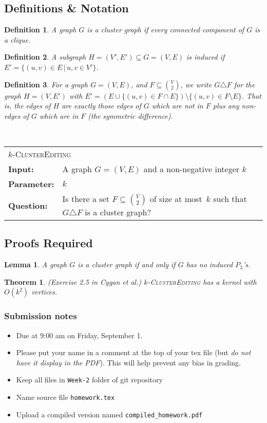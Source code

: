 \documentclass{article}
\newcommand{\defproblem}[4]{%
  \hfill\\\smallskip\noindent%
  \begin{tabularx}{\textwidth}{|l X|}%
    \hline%
    \multicolumn{2}{|l|}{\pname{#1}}\\%
    \textbf{Input:}&#2\\%
    \textbf{Parameter:}&#3\\%
    \textbf{Question:}&#4\smallskip\\\hline%
  \end{tabularx}%
  \smallskip%
}%
\newcommand{\pname}[1]{\textnormal{\textsc{#1}}}
\newtheorem*{theorem}{Theorem}
\newtheorem{definition}{Definition}
\newtheorem*{lemma}{Lemma}
\begin{document}
\subsection*{Definitions \& Notation}
\begin{definition}
A graph $G$ is a \emph{cluster graph} if every connected component of $G$ is a clique.
\end{definition}

\begin{definition}
A subgraph $H = (V',E') \subseteq G = (V,E)$ is \emph{induced} if
$E' = \{(u,v) \in E \,|\, u,v \in V'\}$.
\end{definition}

\begin{definition}
For a graph $G = (V,E)$, and $F \subseteq \binom{V}{2}$, we write $G \triangle F$
for the graph $H = (V,E')$ with
$E' = \left(E \cup \{(u,v) \in F \cap E \}\right) \setminus \{(u,v) \in F \setminus E\}$.
That is, the edges of $H$ are exactly those edges of $G$ which are not in $F$ plus any
non-edges of $G$ which are in $F$ (the symmetric difference).
\end{definition}


\defproblem{$k$-ClusterEditing}
%
{A graph $G = (V,E)$ and a non-negative integer $k$}
%
{$k$}
%
{Is there a set $F \subseteq \binom{V}{2}$ of size at most~$k$ such that $G \triangle F$
  is a cluster graph?}
%


\subsection*{Proofs Required}
\begin{lemma}
A graph $G$ is a cluster graph if and only if $G$ has no induced $P_3$'s.
\end{lemma}

\begin{theorem} ({\small Exercise 2.5 in Cygan et al.}) $k$-\pname{ClusterEditing} has a kernel with $O(k^2)$
  vertices.
\end{theorem}


\vfill

\subsubsection*{Submission notes}
\begin{itemize}
\item Due at 9:00 am on Friday, September 1.
\item Please put your name in a comment at the top of your tex file (but {\it do not
have it display in the PDF}). This will help prevent any bias in grading.
\item Keep all files in \texttt{Week-2} folder of git repository
\item Name source file \texttt{homework.tex}
\item Upload a compiled version named \texttt{compiled\_homework.pdf}
\end{itemize}
\end{document}
